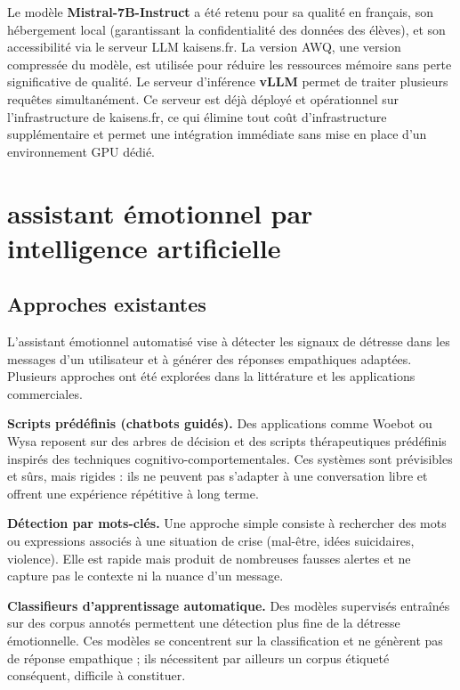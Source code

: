 Le modèle \textbf{Mistral-7B-Instruct} a été retenu pour sa qualité en français,
son hébergement local (garantissant la confidentialité des données des élèves),
et son accessibilité via le serveur LLM kaisens.fr.
La version AWQ, une version compressée du modèle, est utilisée
pour réduire les ressources mémoire sans perte significative de qualité.
Le serveur d'inférence \textbf{vLLM} \cite{vllm2023} permet de traiter
plusieurs requêtes simultanément.
Ce serveur est déjà déployé et opérationnel sur l'infrastructure de kaisens.fr,
ce qui élimine tout coût d'infrastructure supplémentaire et permet une intégration
immédiate sans mise en place d'un environnement GPU dédié.

\section{assistant émotionnel par intelligence artificielle}

\subsection{Approches existantes}

L'assistant émotionnel automatisé vise à détecter les signaux de détresse
dans les messages d'un utilisateur et à générer des réponses empathiques adaptées.
Plusieurs approches ont été explorées dans la littérature et les applications commerciales.

\textbf{Scripts prédéfinis (chatbots guidés).}
Des applications comme Woebot ou Wysa reposent sur des arbres de décision
et des scripts thérapeutiques prédéfinis inspirés des techniques cognitivo-comportementales.
Ces systèmes sont prévisibles et sûrs, mais rigides :
ils ne peuvent pas s'adapter à une conversation libre
et offrent une expérience répétitive à long terme.

\textbf{Détection par mots-clés.}
Une approche simple consiste à rechercher des mots ou expressions
associés à une situation de crise (mal-être, idées suicidaires, violence).
Elle est rapide mais produit de nombreuses fausses alertes
et ne capture pas le contexte ni la nuance d'un message.

\textbf{Classifieurs d'apprentissage automatique.}
Des modèles supervisés entraînés sur des corpus annotés
permettent une détection plus fine de la détresse émotionnelle.
Ces modèles se concentrent sur la classification et ne génèrent pas de réponse empathique ;
ils nécessitent par ailleurs un corpus étiqueté conséquent, difficile à constituer.

